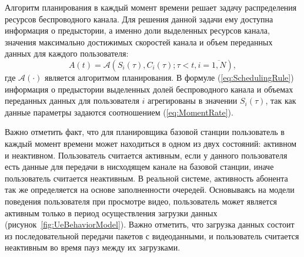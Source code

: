 Алгоритм планирования в каждый момент времени решает задачу распределения ресурсов беспроводного канала. Для решения данной задачи ему доступна информация о предыстории, а именно доли выделенных ресурсов канала, значения максимально достижимых скоростей канала и объем переданных данных для каждого пользователя:
\begin{equation}
A(t) = \mathcal{A}\left( S_i(\tau), C_i(\tau);\tau<t, i=\overline{1,N} \right),
\label{eq:SchedulingRule}
\end{equation}
где $\mathcal{A}\left(\cdot\right)$ является алгоритмом планирования. В формуле (\ref{eq:SchedulingRule}) информация о предыстории выделенных долей беспроводного канала и объемах переданных данных для пользователя $i$ агрегированы в значении $S_i(\tau)$, так как данные параметры задаются соотношением (\ref{eq:MomentRate}).

Важно отметить факт, что для планировщика базовой станции пользователь в каждый момент времени может находиться в одном из двух состояний: активном и неактивном. Пользователь считается активным, если у данного пользователя есть данные для передачи в нисходящем канале на базовой станции, иначе пользователь считается неактивным. В реальной системе, активность абонента так же определяется на основе заполненности очередей. Основываясь на модели поведения пользователя при просмотре видео, пользователь может является активным только в период осуществления загрузки данных (рисунок~\ref{fig:UeBehaviorModel}). Важно отметить, что загрузка данных состоит из последовательной передачи пакетов с видеоданными, и пользователь считается неактивным во время пауз между их загрузками.

